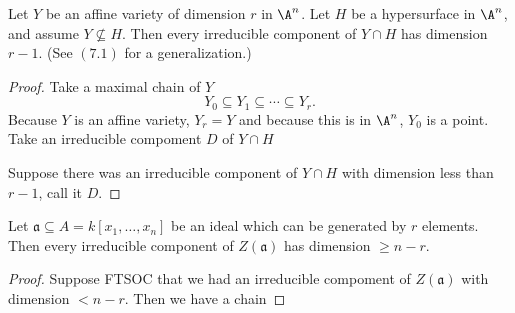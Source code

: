 \documentclass[openany, amssymb, psamsfonts]{amsart}
\begin{document}
\begin{exercise}%
Let $Y$ be an affine variety of dimension $r$ in $\A^n$. Let $H$ be a hypersurface in $\A^n$, and assume $Y \not\subseteq H$. Then every irreducible component of $Y \cap H$ has dimension $r-1$. (See $(7.1)$ for a generalization.)
\end{exercise}
\begin{proof}
	Take a maximal chain of $Y$
	\[
		Y_{0}\subseteq Y_{1}\subseteq \cdots \subseteq Y_r
	.\] 
	Because $Y $ is an affine variety, $Y_r = Y $ and because this is in $\A^n $, $Y_{0} $ is a point.
	Take an irreducible compoment $D $ of $Y\cap H $

	Suppose there was an irreducible component of $Y \cap H $ with dimension less than $r-1 $, call it $D $.
\end{proof}

\begin{exercise}%
Let $\mathfrak{a} \subseteq A = k[x_1,\ldots,x_n]$ be an ideal which can be generated by $r$ elements. Then every irreducible component of $Z(\mathfrak{a})$ has dimension $\ge n-r$.
\end{exercise}
\begin{proof}
	Suppose FTSOC that we had an irreducible compoment of $Z(\mathfrak{a}) $ with dimension $< n-r $.
	Then we have a chain 
\end{proof}
\end{document}
